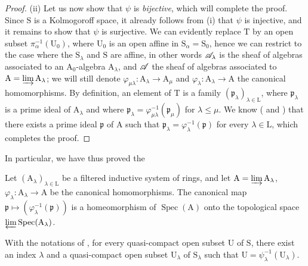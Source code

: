 \begin{proof}
\medskip
\noindent
(ii) Let us now show that $\psi$ is \emph{bijective}, which will complete the proof.
Since $\mathrm{S}$ is a Kolmogoroff space, it already follows from (i) that $\psi$ is injective, and it remains to show that $\psi$ is surjective.
We can evidently replace $\mathrm{T}$ by an open subset $\pi_\alpha^{-1}(\mathrm{U}_0)$, where $\mathrm{U}_0$ is an open affine in $\mathrm{S}_\alpha=\mathrm{S}_0$, hence we can restrict to the case where the $\mathrm{S}_\lambda$ and $\mathrm{S}$ are affine, in other words $\mathscr{A}_\lambda$ is the sheaf of algebras associated to an $\mathrm{A}_0$-algebra $\mathrm{A}_\lambda$, and $\mathscr{A}$ the sheaf of algebras associated to $\mathrm{A}=\varinjlim\mathrm{A}_\lambda$; we will still denote $\varphi_{\mu\lambda}:\mathrm{A}_\lambda\to\mathrm{A}_\mu$ and $\varphi_\lambda:\mathrm{A}_\lambda\to\mathrm{A}$ the canonical homomorphisms.
By definition, an element of $\mathrm{T}$ is a family $(\mathfrak{p}_\lambda)_{\lambda\in\mathrm{L}}$, where $\mathfrak{p}_\lambda$ is a prime ideal of $\mathrm{A}_\lambda$ and where $\mathfrak{p}_\lambda=\varphi_{\mu\lambda}^{-1}(\mathfrak{p}_\mu)$ for $\lambda\leqslant\mu$.
We know ( and ) that there exists a prime ideal $\mathfrak{p}$ of $\mathrm{A}$ such that $\mathfrak{p}_\lambda=\varphi_\lambda^{-1}(\mathfrak{p})$ for every $\lambda\in\mathrm{L}$, which completes the proof.
\end{proof}

In particular, we have thus proved the

\begin{corollary}[8.2.10]
\label{IV.8.2.10}
Let $(\mathrm{A}_\lambda)_{\lambda\in\mathrm{L}}$ be a filtered inductive system of rings, and let $\mathrm{A}=\varinjlim\mathrm{A}_\lambda$, $\varphi_\lambda:\mathrm{A}_\lambda\to\mathrm{A}$ be the canonical homomorphisms.
The canonical map $\mathfrak{p}\mapsto(\varphi_\lambda^{-1}(\mathfrak{p}))$ is a homeomorphism of $\operatorname{Spec}(\mathrm{A})$ onto the topological space $\varprojlim\operatorname{Spec}(\mathrm{A}_\lambda)$.
\end{corollary}

\begin{corollary}[8.2.11]
\label{IV.8.2.11}
With the notations of , for every quasi-compact open subset $\mathrm{U}$ of $\mathrm{S}$, there exist an index $\lambda$ and a quasi-compact open subset $\mathrm{U}_\lambda$ of $\mathrm{S}_\lambda$ such that $\mathrm{U}=\psi_\lambda^{-1}(\mathrm{U}_\lambda)$.
\end{corollary}

